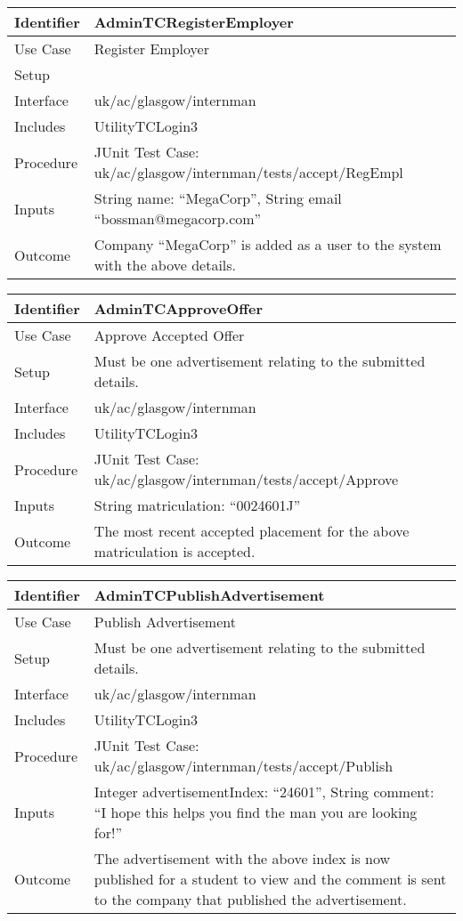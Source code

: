 \begin{tabularx}{\textwidth}{|T|L|}
\hline
Identifier & AdminTCRegisterEmployer\\
\hline
Use Case & Register Employer\\
\hline
Setup & \\
\hline
Interface & uk/ac/glasgow/internman\\
\hline
Includes & UtilityTCLogin3\\
\hline
Procedure & JUnit Test Case: uk/ac/glasgow/internman/tests/accept/RegEmpl\\
\hline
Inputs & String name: ``MegaCorp'', String email ``bossman@megacorp.com''\\
\hline
Outcome & Company ``MegaCorp'' is added as a user to the system with
the above details.\\
\hline
\end{tabularx}

\begin{tabularx}{\textwidth}{|T|L|}
\hline
Identifier & AdminTCApproveOffer\\
\hline
Use Case & Approve Accepted Offer\\
\hline
Setup & Must be one advertisement relating to the submitted details.\\
\hline
Interface & uk/ac/glasgow/internman\\
\hline
Includes & UtilityTCLogin3\\
\hline
Procedure & JUnit Test Case: uk/ac/glasgow/internman/tests/accept/Approve\\
\hline
Inputs & String matriculation: ``0024601J''\\
\hline
Outcome & The most recent accepted placement for the above
matriculation is accepted.\\
\hline
\end{tabularx}

\begin{tabularx}{\textwidth}{|T|L|}
\hline
Identifier & AdminTCPublishAdvertisement\\
\hline
Use Case & Publish Advertisement\\
\hline
Setup & Must be one advertisement relating to the submitted details.\\
\hline
Interface & uk/ac/glasgow/internman\\
\hline
Includes & UtilityTCLogin3\\
\hline
Procedure & JUnit Test Case: uk/ac/glasgow/internman/tests/accept/Publish\\
\hline
Inputs & Integer advertisementIndex: ``24601'', String comment:
``I hope this helps you find the man you are looking for!''\\
\hline
Outcome & The advertisement with the above index is now published for
a student to view and the comment is sent to the company that
published the advertisement.\\
\hline
\end{tabularx}

